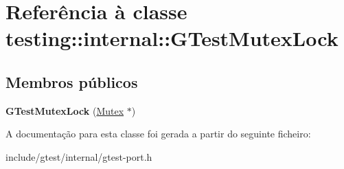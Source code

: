 \hypertarget{classtesting_1_1internal_1_1GTestMutexLock}{\section{Referência à classe testing\-:\-:internal\-:\-:G\-Test\-Mutex\-Lock}
\label{classtesting_1_1internal_1_1GTestMutexLock}
}
\subsection*{Membros públicos}
\begin{DoxyCompactItemize}
\item 
\hypertarget{classtesting_1_1internal_1_1GTestMutexLock_a77e3cba326d5356b4a1dea3790559c26}{{\bfseries G\-Test\-Mutex\-Lock} (\hyperlink{classtesting_1_1internal_1_1Mutex}{Mutex} $\ast$)}\label{classtesting_1_1internal_1_1GTestMutexLock_a77e3cba326d5356b4a1dea3790559c26}

\end{DoxyCompactItemize}


A documentação para esta classe foi gerada a partir do seguinte ficheiro\-:\begin{DoxyCompactItemize}
\item 
include/gtest/internal/gtest-\/port.\-h\end{DoxyCompactItemize}
